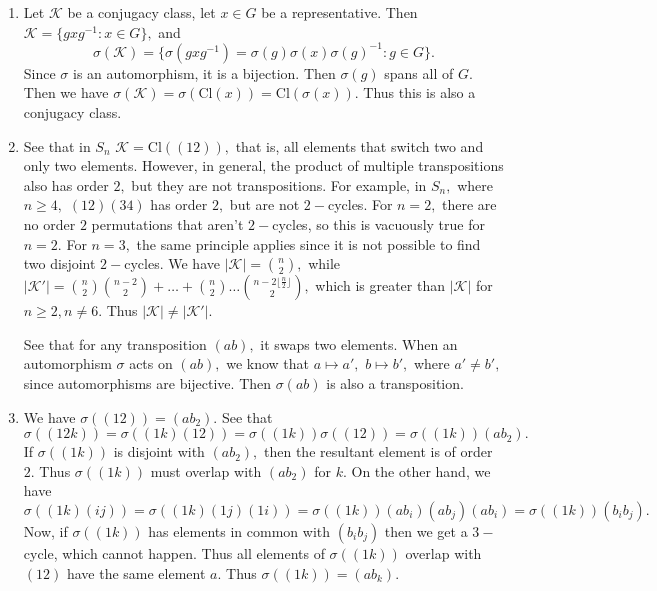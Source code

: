 \documentclass{article}
\title{} %
\author{Gandhar Kulkarni (mmat2304)} %
\date{} %
\begin{document}
\maketitle %


\section{} %
\begin{enumerate}
	\item Let $\mathcal{K}$ be a conjugacy class, let $x \in G$ be a representative. Then $\mathcal{K}=\{gxg^{-1}: x \in G  \},$ and $$\sigma(\mathcal{K})= 
	\{ \sigma(gxg^{-1})= \sigma(g) \sigma(x) \sigma(g)^{-1}: g \in G\}.$$ Since $\sigma$ is an automorphism, it is a bijection. Then $\sigma(g)$ spans all 
	of $G.$ Then we have $\sigma(\mathcal{K})=\sigma(\text{Cl}(x))= \text{Cl}(\sigma(x)).$ Thus this is also a conjugacy class.
	\item See that in $S_n$ $\mathcal{K}=\text{Cl}((12)),$ that is, all elements that switch two and only two elements. 
	However, in general, the product of multiple transpositions also has order $2,$ but they are not transpositions. For example, in $S_n,$ where $n \geq 
	4,$ $(1 2)(3 4)$ has order $2,$ but are not $2-$cycles. For $n=2,$ there are no order $2$ permutations that aren't $2-$cycles, so this is vacuously true 
	for $n=2.$ For $n=3,$ the same principle applies since it is not possible to find two disjoint $2-$cycles. We have $ |\mathcal{K}| = \binom{n}{2},$ 
	while $|\mathcal{K'}| = \binom{n}{2}\binom{n-2}{2} + \dots + \binom{n}{2} \dots \binom{n- 2 \lfloor\frac{n}{2}\rfloor}{2},$ which is greater than 
	$|\mathcal{K}|$ for $n \geq 2, n \neq 6.$ Thus $|\mathcal{K}| \neq |\mathcal{K'}|.$ 
	
	See that for any transposition $(a b),$ it swaps two elements. When an automorphism $\sigma$ acts on $(a b),$ we know that $a \mapsto a',$ $b \mapsto 
	b',$ where $a' \neq b',$ since automorphisms are bijective. Then $\sigma(a b)$ is also a transposition.
	\item  We have $\sigma((1 2))= (a b_2).$ See that $\sigma((1 2 k))= \sigma ((1 k ) (1 2)  )= \sigma((1 k))\sigma((1 2))=\sigma((1 k)) (a b_2).$ If 
	$\sigma((1 k))$ is disjoint with $(a b_2),$ then the resultant element is of order $2.$ Thus $\sigma((1 k))$ must overlap with $(a b_2)$ for $k.$ 
	On the other hand, we have $$\sigma((1 k)(i j))= \sigma((1 k)(1 j)(1 i))= \sigma((1 k))(a b_i)(a b_j)(a b_i)= \sigma((1 k))(b_i b_j).$$
	Now, if $\sigma((1 k))$ has elements in common with $(b_i b_j)$ then we get a $3-$cycle, which cannot happen. Thus all elements of $\sigma((1 k))$ 
	overlap with $(1 2)$ have the same element $a$. Thus $\sigma((1 k))=(a b_k).$
	

\end{enumerate}
\end{document}
